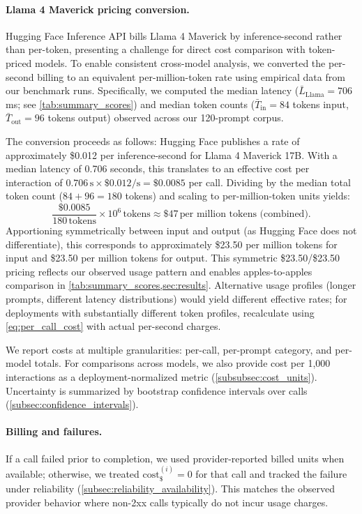 \FloatBarrier

\paragraph{Llama 4 Maverick pricing conversion.} Hugging Face Inference API bills Llama 4 Maverick by inference-second rather than per-token, presenting a challenge for direct cost comparison with token-priced models. To enable consistent cross-model analysis, we converted the per-second billing to an equivalent per-million-token rate using empirical data from our benchmark runs. Specifically, we computed the median latency ($\bar{L}_{\text{Llama}} = 706$\,ms; see \cref{tab:summary_scores}) and median token counts ($\bar{T}_{\text{in}} = 84$ tokens input, $\bar{T}_{\text{out}} = 96$ tokens output) observed across our 120-prompt corpus. 

The conversion proceeds as follows: Hugging Face publishes a rate of approximately \$0.012 per inference-second for Llama 4 Maverick 17B. With a median latency of 0.706 seconds, this translates to an effective cost per interaction of $0.706\,\text{s} \times \$0.012/\text{s} = \$0.0085$ per call. Dividing by the median total token count ($84 + 96 = 180$ tokens) and scaling to per-million-token units yields:
\[
\frac{\$0.0085}{180\,\text{tokens}} \times 10^6\,\text{tokens} \approx \$47\,\text{per million tokens (combined)}.
\]
Apportioning symmetrically between input and output (as Hugging Face does not differentiate), this corresponds to approximately \$23.50 per million tokens for input and \$23.50 per million tokens for output. This symmetric \$23.50/\$23.50 pricing reflects our observed usage pattern and enables apples-to-apples comparison in \cref{tab:summary_scores,sec:results}. Alternative usage profiles (longer prompts, different latency distributions) would yield different effective rates; for deployments with substantially different token profiles, recalculate using \cref{eq:per_call_cost} with actual per-second charges.

We report costs at multiple granularities: per-call, per-prompt category, and per-model totals. For comparisons across models, we also provide cost per 1{,}000 interactions as a deployment-normalized metric (\cref{subsubsec:cost_units}). Uncertainty is summarized by bootstrap confidence intervals over calls (\cref{subsec:confidence_intervals}).

\paragraph{Billing and failures.} If a call failed prior to completion, we used provider-reported billed units when available; otherwise, we treated $\mathrm{cost}^{(i)}_{\$}=0$ for that call and tracked the failure under reliability (\cref{subsec:reliability_availability}). This matches the observed provider behavior where non-2xx calls typically do not incur usage charges.

